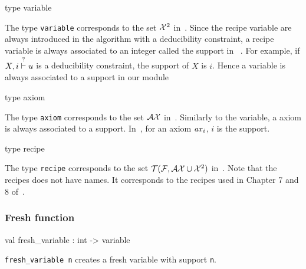 \label{type:Recipe.variable}\begin{ocamldoccode}
type variable 
\end{ocamldoccode}
\begin{ocamldocdescription}
The type {\tt{variable}} corresponds to the set $\mathcal{X}^2$ in~\thesis. 
    Since the recipe variable are always introduced in the algorithm with a deducibility constraint, 
    a recipe variable is always associated to an integer called the support in ~\thesis . 
    For example, if $X, i \stackrel{?}{\vdash} u$ is a deducibility constraint, the support of $X$ is $i$.
    Hence a variable is always associated to a support in our module


\end{ocamldocdescription}




\label{type:Recipe.axiom}\begin{ocamldoccode}
type axiom 
\end{ocamldoccode}
\begin{ocamldocdescription}
The type {\tt{axiom}} corresponds to the set $\mathcal{AX}$ in~\thesis. Similarly to the variable, a axiom 
    is always associated to a support. In~\thesis, for an axiom $\mathit{ax}_i$, $i$ is the support.


\end{ocamldocdescription}




\label{type:Recipe.recipe}\begin{ocamldoccode}
type recipe 
\end{ocamldoccode}
\begin{ocamldocdescription}
The type {\tt{recipe}} corresponds to the set $\mathcal{T}(\mathcal{F}, \mathcal{AX} \cup \mathcal{X}^2)$ in~\thesis. Note that the recipes
    does not have names. It corresponds to the recipes used in Chapter 7 and 8 of~\thesis. 


\end{ocamldocdescription}




\subsubsection{Fresh function}




\label{val:Recipe.fresh-underscorevariable}\begin{ocamldoccode}
val fresh_variable : int -> variable
\end{ocamldoccode}
\begin{ocamldocdescription}
{\tt{fresh\_variable n}} creates a fresh variable with support {\tt{n}}.


\end{ocamldocdescription}




